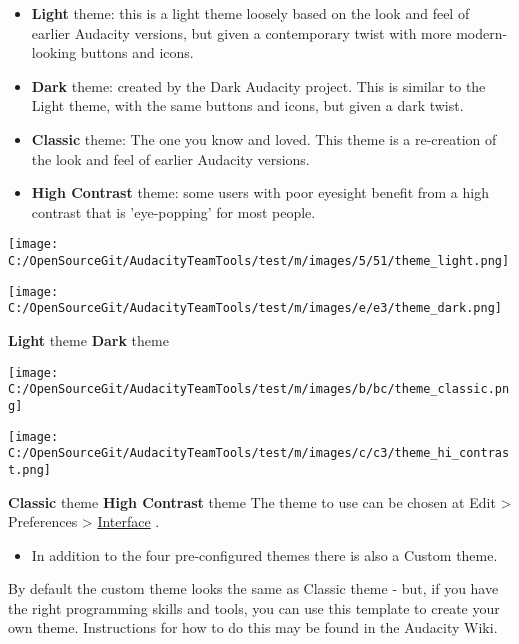 \begin{multicols}{2}
\begin{itemize}
\item \textbf{Light} theme: this is a light theme loosely based on the look and feel of earlier Audacity versions, but given a contemporary twist with more modern-looking buttons and icons. 
\item \textbf{Dark} theme: created by the Dark Audacity project. This is similar to the Light theme, with the same buttons and icons, but given a dark twist.
\item \textbf{Classic} theme: The one you know and loved. This theme is a re-creation of the look and feel of earlier Audacity versions. 
\item \textbf{High Contrast} theme: some users with poor eyesight benefit from a high contrast that is 'eye-popping' for most people.
\end{itemize}
\par \par \protect\texttt{[image: C:/OpenSourceGit/AudacityTeamTools/test/m/images/5/51/theme\_light.png]}\par \par \protect\texttt{[image: C:/OpenSourceGit/AudacityTeamTools/test/m/images/e/e3/theme\_dark.png]}\par \par \textbf{Light} theme
\textbf{Dark} theme
\par \par \protect\texttt{[image: C:/OpenSourceGit/AudacityTeamTools/test/m/images/b/bc/theme\_classic.png]}\par \par \protect\texttt{[image: C:/OpenSourceGit/AudacityTeamTools/test/m/images/c/c3/theme\_hi\_contrast.png]}\par \par \textbf{Classic} theme
\textbf{High Contrast} theme
The theme to use can be chosen at Edit > Preferences > 
\hyperref[\foo{interface_preferences_}]{Interface}
.  

\begin{itemize}
\item  In addition to the four pre-configured themes there is also a Custom theme.  
\end{itemize}
 By default the custom theme looks the same as Classic theme - but, if you have the right programming skills and tools, you can use this template to create your own theme.  Instructions for how to do this may be found in the Audacity Wiki.
\label{new_features_in_this_release_midi}

\end{multicols}
